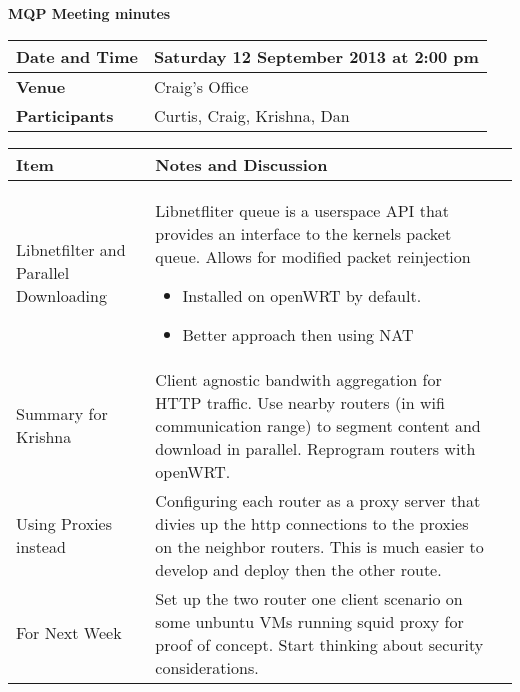 \documentclass[a4wide,10pt]{extarticle}
\begin{document}
\thispagestyle{empty}

\begin{center}
\textbf{MQP Meeting minutes}
\vspace{0.33cm}
\end{center}

\begin{center}
\begin{tabular}{| m{2.8cm} | m{13.6cm} |} \hline
\textbf{Date and Time} & Saturday 12 September 2013 at 2:00 pm \\ \hline
\textbf{Venue} & Craig's Office \\ \hline
\textbf{Participants} & Curtis, Craig, Krishna, Dan\\ \hline
\end{tabular}
\end{center}

\vspace{0.5cm}
\begin{center}
\begin{tabular}{| m{3.0cm} | m{12.6cm} | m{2cm}|} \hline
\textbf{Item} & \textbf{Notes and Discussion}\\ \hline
Libnetfilter and Parallel Downloading & Libnetfliter queue is a userspace API that provides an interface to the kernels packet queue. Allows for modified packet reinjection
\begin{itemize}
\item Installed on openWRT by default. 
\item Better approach then using NAT
\end{itemize}\\ \hline
Summary for Krishna & Client agnostic bandwith aggregation for HTTP traffic. Use nearby routers (in wifi communication range) to segment content and download in parallel. Reprogram routers with openWRT.\\ \hline
Using Proxies instead & Configuring each router as a proxy server that divies up the http connections to the proxies on the neighbor routers. This is much easier to develop and deploy then the other route. \\ \hline
For Next Week & Set up the two router one client scenario on some unbuntu VMs running squid proxy for proof of concept. Start thinking about security considerations.\\ \hline

\end{tabular}
\end{center}
\end{document}
